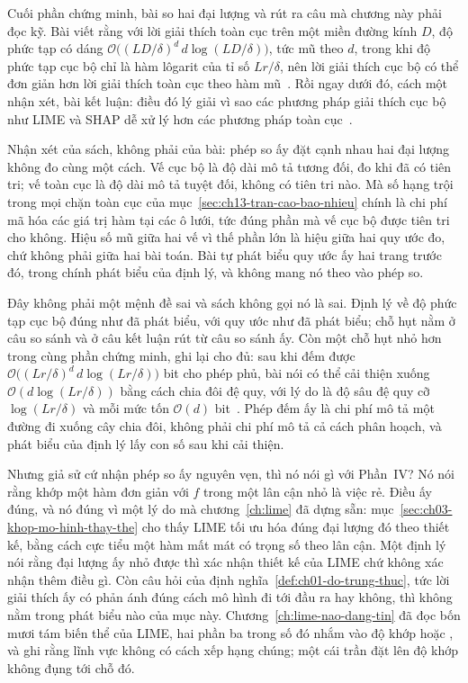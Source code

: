 Cuối phần chứng minh, bài so hai đại lượng và rút ra câu mà chương này phải đọc
kỹ. Bài viết rằng với lời giải thích toàn cục trên một miền đường kính $D$, độ
phức tạp có dáng $\mathcal{O}\big((LD/\delta)^d \, d \log(LD/\delta)\big)$, tức
mũ theo $d$, trong khi độ phức tạp cục bộ chỉ là hàm lôgarit của tỉ số
$Lr/\delta$, nên lời giải thích cục bộ có thể đơn giản hơn lời giải thích toàn
cục theo hàm mũ~\autocite{p26limits}. Rồi ngay dưới đó, cách một nhận xét, bài
kết luận: điều đó lý giải vì sao các phương pháp giải thích cục bộ như LIME và
SHAP dễ xử lý hơn các phương pháp toàn cục~\autocite{p26limits}.

Nhận xét của sách, không phải của bài: phép so ấy đặt cạnh nhau hai đại lượng
không đo cùng một cách. Vế cục bộ là độ dài mô tả tương đối, đo khi đã có tiên
tri; vế toàn cục là độ dài mô tả tuyệt đối, không có tiên tri nào. Mà số hạng
trội trong mọi chặn toàn cục của mục~\ref{sec:ch13-tran-cao-bao-nhieu} chính là
chi phí mã hóa các giá trị hàm tại các ô lưới, tức đúng phần mà vế cục bộ được
tiên tri cho không. Hiệu số mũ giữa hai vế vì thế phần lớn là hiệu giữa hai quy
ước đo, chứ không phải giữa hai bài toán. Bài tự phát biểu quy ước ấy hai trang
trước đó, trong chính phát biểu của định lý, và không mang nó theo vào phép so.

Đây không phải một mệnh đề sai và sách không gọi nó là sai. Định lý về độ phức
tạp cục bộ đúng như đã phát biểu, với quy ước như đã phát biểu; chỗ hụt nằm ở
câu so sánh và ở câu kết luận rút từ câu so sánh ấy. Còn một chỗ hụt nhỏ hơn
trong cùng phần chứng minh, ghi lại cho đủ: sau khi đếm được
$\mathcal{O}\big((Lr/\delta)^d \, d\log(Lr/\delta)\big)$ bit cho phép phủ, bài
nói có thể cải thiện xuống $\mathcal{O}(d \log(Lr/\delta))$ bằng cách chia đôi
đệ quy, với lý do là độ sâu đệ quy cỡ $\log(Lr/\delta)$ và mỗi mức tốn
$\mathcal{O}(d)$ bit~\autocite{p26limits}. Phép đếm ấy là chi phí mô tả một
đường đi xuống cây chia đôi, không phải chi phí mô tả cả cách phân hoạch, và
phát biểu của định lý lấy con số sau khi cải thiện.

%
Nhưng giả sử cứ nhận phép so ấy nguyên vẹn, thì nó nói gì với Phần~IV? Nó nói
rằng khớp một hàm đơn giản với $f$ trong một lân cận nhỏ là việc rẻ. Điều ấy
đúng, và nó đúng vì một lý do mà chương~\ref{ch:lime} đã dựng sẵn:
mục~\ref{sec:ch03-khop-mo-hinh-thay-the} cho thấy LIME tối ưu hóa đúng đại lượng
đó theo thiết kế, bằng cách cực tiểu một hàm mất mát có trọng số theo lân cận.
Một định lý nói rằng đại lượng ấy nhỏ được thì xác nhận thiết kế của LIME chứ
không xác nhận thêm điều gì. Còn câu hỏi của định
nghĩa~\ref{def:ch01-do-trung-thuc}, tức lời giải thích ấy có phản ánh đúng cách
mô hình đi tới đầu ra hay không, thì không nằm trong phát biểu nào của mục này.
Chương~\ref{ch:lime-nao-dang-tin} đã đọc bốn mươi tám biến thể của LIME, hai
phần ba trong số đó nhắm vào độ khớp hoặc , và ghi
rằng lĩnh vực
không có cách xếp hạng chúng; một cái trần đặt lên độ khớp không đụng tới chỗ
đó.

%
